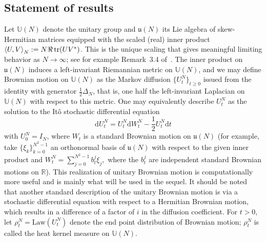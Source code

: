 \documentclass[11pt]{article}
\theoremstyle{definition}
\numberwithin{equation}{section}
\numberwithin{figure}{section}
\numberwithin{table}{section}
\DeclareMathOperator{\tr}{tr}
\newcommand{\Unitary}[1]{\mathbb{U}\left(#1\right)}
\newcommand{\R}{\mathbb{R}}
\newcommand{\inprod}[2]{\left\langle #1, #2 \right\rangle}
\newcommand*{\dd}{\mathrm{d}}
\newcommand*{\dt}{\dd t}
\newcommand*{\mK}{\mkern 1mu}
\begin{document}
\subsection*{Statement of results}

Let $\Unitary{N}$ denote the unitary group and $\mathfrak{u}(N)$ its Lie algebra of skew-Hermitian matrices equipped with the scaled (real) inner product $\inprod{U}{V}_N:=N\mK \Re\tr(UV^*)$. This is the unique scaling that gives meaningful limiting behavior as $N\rightarrow\infty$; see for example Remark~3.4 of~\cite{DHK2013}. The inner product on $\mathfrak{u}(N)$ induces a left-invariant Riemannian metric on $\mathbb{U}(N)$, and we may define Brownian motion on $\Unitary{N}$ as the Markov diffusion $\{U^N_t\}_{t\ge0}$ issued from the identity with generator $\frac{1}{2}\Delta_{N}$, that is, one half the left-invariant Laplacian on $\mathbb{U}(N)$ with respect to this metric. One may equivalently describe $U^N_t$ as the solution to the It\^o stochastic differential equation
\begin{equation*}
\dd U^N_t=U^{N}_t\dd W^N_t-\frac{1}{2}U^{N}_t\dt
\end{equation*}
with $U^N_0=I_N$, where $W_t$ is a standard Brownian motion on $\mathfrak{u}(N)$ (for example, take $\{\xi_k\}_{k=0}^{N^2-1}$ an orthonormal basis of $\mathfrak{u}(N)$ with respect to the given inner product and $W^N_t=\sum_{j=0}^{N^2-1}b^j_t\xi_j,$ where the $b^j_t$ are independent standard Brownian motions on $\R$). This realization of unitary Brownian motion is computationally more useful and is mainly what will be used in the sequel. It should be noted that another standard description of the unitary Brownian motion is via a stochastic differential equation with respect to a Hermitian Brownian motion, which results in a difference of a factor of $i$ in the diffusion coefficient. For $t>0$, let $\rho^N_t=\mathrm{Law}(U^N_t)$ denote the end point distribution of Brownian motion; $\rho^N_t$ is called the heat kernel measure on $\mathbb{U}(N)$.
\end{document}
